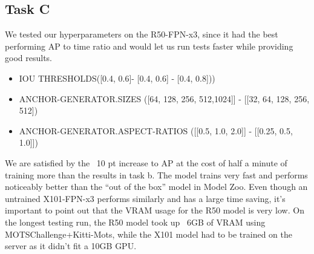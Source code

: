 \documentclass[12pt,a4paper,twocolumn,twoside]{article}
\begin{document}
\subsection{Task C}
We tested our hyperparameters on the R50-FPN-x3, since it had the best performing AP to time ratio and would let us run tests faster while providing good results.
\begin{itemize}
    \item IOU THRESHOLDS([0.4, 0.6]- [0.4, 0.6] - [0.4, 0.8]))
    \item ANCHOR-GENERATOR.SIZES ([64, 128, 256, 512,1024]] - [[32, 64, 128, 256, 512])
    \item ANCHOR-GENERATOR.ASPECT-RATIOS ([[0.5, 1.0, 2.0]] - [[0.25, 0.5, 1.0]])
\end{itemize}
We are satisfied by the ~10 pt increase to AP at the cost of half a minute of training more than the results in task b. The model trains very fast and performs noticeably better than the “out of the box” model in Model Zoo. Even though an untrained X101-FPN-x3 performs similarly and has a large time saving, it’s important to point out that the VRAM usage for the R50 model is very low. On the longest testing run, the R50 model took up ~6GB of VRAM using MOTSChallenge+Kitti-Mots, while the X101 model had to be trained on the server as it didn’t fit a 10GB GPU.
 
\end{document}
